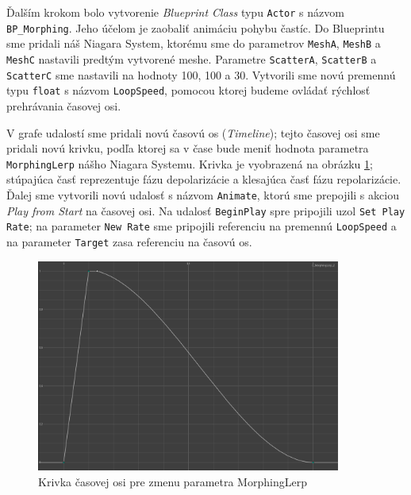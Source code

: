 Ďalším krokom bolo vytvorenie \emph{Blueprint Class} typu \texttt{Actor} s názvom \texttt{BP\_Morphing}. Jeho účelom je zaobaliť animáciu pohybu častíc. Do Blueprintu sme pridali náš Niagara System, ktorému sme do 
parametrov \texttt{MeshA}, \texttt{MeshB} a \texttt{MeshC} nastavili predtým vytvorené meshe. Parametre \texttt{ScatterA}, \texttt{ScatterB} a \texttt{ScatterC} sme nastavili na hodnoty 100, 100 a 30. Vytvorili sme 
novú premennú typu \texttt{float} s názvom \texttt{LoopSpeed}, pomocou ktorej budeme ovládať rýchlosť prehrávania časovej osi.

V grafe udalostí sme pridali novú časovú os (\emph{Timeline}); tejto časovej osi sme pridali novú krivku, podľa ktorej sa v čase bude meniť hodnota parametra \texttt{MorphingLerp} nášho Niagara Systemu. Krivka je vyobrazená
na obrázku \ref{krivka1}; stúpajúca časť reprezentuje fázu depolarizácie a klesajúca časť fázu repolarizácie. Ďalej sme vytvorili novú udalosť s názvom \texttt{Animate}, ktorú sme prepojili s akciou \emph{Play from Start} 
na časovej osi. Na udalosť \texttt{BeginPlay} spre pripojili uzol \texttt{Set Play Rate}; na parameter \texttt{New Rate} sme pripojili referenciu na premennú \texttt{LoopSpeed} a na parameter \texttt{Target} zasa referenciu
na časovú os.

\begin{figure}[!htbp]
  \centering
  \includegraphics[width=10cm]{img/krivka1_1.png}
  \caption{Krivka časovej osi pre zmenu parametra MorphingLerp}
  \label{krivka1}
\end{figure}

